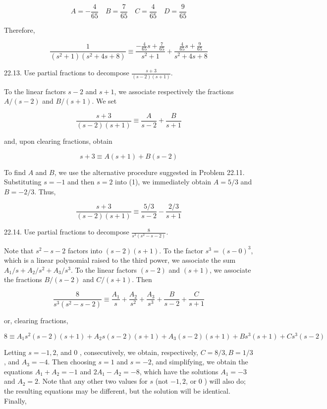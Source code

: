 \documentclass[10pt]{article}
\begin{document}
$$
A=-\frac{4}{65} \quad B=\frac{7}{65} \quad C=\frac{4}{65} \quad D=\frac{9}{65}
$$

Therefore,

$$
\frac{1}{\left(s^{2}+1\right)\left(s^{2}+4 s+8\right)} \equiv \frac{-\frac{4}{65} s+\frac{7}{65}}{s^{2}+1}+\frac{\frac{4}{65} s+\frac{9}{65}}{s^{2}+4 s+8}
$$

22.13. Use partial fractions to decompose $\frac{s+3}{(s-2)(s+1)}$.

To the linear factors $s-2$ and $s+1$, we associate respectively the fractions $A /(s-2)$ and $B /(s+1)$. We set

$$
\frac{s+3}{(s-2)(s+1)} \equiv \frac{A}{s-2}+\frac{B}{s+1}
$$

and, upon clearing fractions, obtain


\begin{equation*}
s+3 \equiv A(s+1)+B(s-2) \tag{1}
\end{equation*}


To find $A$ and $B$, we use the alternative procedure suggested in Problem 22.11. Substituting $s=-1$ and then $s=2$ into (1), we immediately obtain $A=5 / 3$ and $B=-2 / 3$. Thus,

$$
\frac{s+3}{(s-2)(s+1)} \equiv \frac{5 / 3}{s-2}-\frac{2 / 3}{s+1}
$$

22.14. Use partial fractions to decompose $\frac{8}{s^{3}\left(s^{2}-s-2\right)}$.

Note that $s^{2}-s-2$ factors into $(s-2)(s+1)$. To the factor $s^{3}=(s-0)^{3}$, which is a linear polynomial raised to the third power, we associate the sum $A_{1} / s+A_{2} / s^{2}+A_{3} / s^{3}$. To the linear factors $(s-2)$ and $(s+1)$, we associate the fractions $B /(s-2)$ and $C /(s+1)$. Then

$$
\frac{8}{s^{3}\left(s^{2}-s-2\right)} \equiv \frac{A_{1}}{s}+\frac{A_{2}}{s^{2}}+\frac{A_{3}}{s^{3}}+\frac{B}{s-2}+\frac{C}{s+1}
$$

or, clearing fractions,

$$
8 \equiv A_{1} s^{2}(s-2)(s+1)+A_{2} s(s-2)(s+1)+A_{3}(s-2)(s+1)+B s^{3}(s+1)+C s^{3}(s-2)
$$

Letting $s=-1,2$, and 0 , consecutively, we obtain, respectively, $C=8 / 3, B=1 / 3$, and $A_{3}=-4$. Then choosing $s=1$ and $s=-2$, and simplifying, we obtain the equations $A_{1}+A_{2}=-1$ and $2 A_{1}-A_{2}=-8$, which have the solutions $A_{1}=-3$ and $A_{2}=2$. Note that any other two values for $s$ (not $-1,2$, or 0 ) will also do; the resulting equations may be different, but the solution will be identical. Finally,
\end{document}
